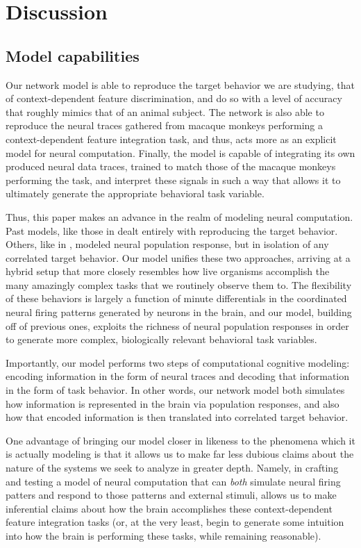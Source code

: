 \documentclass[12pt,a4paper,final]{iopart}
\begin{document}
\section{Discussion}
\label{sec:dis}
\subsection{Model capabilities}
Our network model is able to reproduce the target behavior we are studying, that of context-dependent feature discrimination, and do so with a level of accuracy that roughly mimics that of an animal subject. The network is also able to reproduce the neural traces gathered from macaque monkeys performing a context-dependent feature integration task, and thus, acts more as an explicit model for neural computation. Finally, the model is capable of integrating its own produced neural data traces, trained to match those of the macaque monkeys performing the task, and interpret these signals in such a way that allows it to ultimately generate the appropriate behavioral task variable. 

Thus, this paper makes an advance in the realm of modeling neural computation. Past models, like those in \cite{Mante2013} dealt entirely with reproducing the target behavior. Others, like in \cite{Rajan}, modeled neural population response, but in isolation of any correlated target behavior. Our model unifies these two approaches, arriving at a hybrid setup that more closely resembles how live organisms accomplish the many amazingly complex tasks that we routinely observe them to. The flexibility of these behaviors is largely a function of minute differentials in the coordinated neural firing patterns generated by neurons in the brain, and our model, building off of previous ones, exploits the richness of neural population responses in order to generate more complex, biologically relevant behavioral task variables.

Importantly, our model performs two steps of computational cognitive modeling: encoding information in the form of neural traces and decoding that information in the form of task behavior. In other words, our network model both simulates how information is represented in the brain via population responses, and also how that encoded information is then translated into correlated target behavior.

One advantage of bringing our model closer in likeness to the phenomena which it is actually modeling is that it allows us to make far less dubious claims about the nature of the systems we seek to analyze in greater depth. Namely, in crafting and testing a model of neural computation that can \emph{both} simulate neural firing patters and respond to those patterns and external stimuli, allows us to make inferential claims about how the brain accomplishes these context-dependent feature integration tasks (or, at the very least, begin to generate some intuition into how the brain is performing these tasks, while remaining reasonable). 
\end{document}
